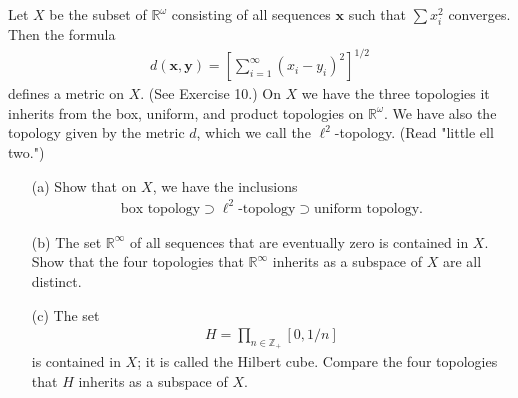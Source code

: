   \begin{exercise}[Munkres 20.8]
    Let $X$ be the subset of $\mathbb{R}^\omega$ consisting of all sequences $\mathbf{x}$ such that $\sum x_i^2$ converges. Then the formula
    \begin{align*}
      d(\mathbf{x}, \mathbf{y}) = \left[\sum_{i=1}^{\infty}(x_i - y_i)^2\right]^{1/2}
    \end{align*}
    defines a metric on $X$. (See Exercise 10.) On $X$ we have the three topologies it inherits from the box, uniform, and product topologies on $\mathbb{R}^\omega$. We have also the topology given by the metric $d$, which we call the $\ell^2$-topology. (Read "little ell two.")
    \begin{enumerate} 
      \item[(a)] Show that on $X$, we have the inclusions
      \begin{align*}
        \text{box topology} \supset \ell^2\text{-topology} \supset \text{uniform topology}.
      \end{align*}
      
      \item[(b)] The set $\mathbb{R}^\infty$ of all sequences that are eventually zero is contained in $X$. Show that the four topologies that $\mathbb{R}^\infty$ inherits as a subspace of $X$ are all distinct.
      
      \item[(c)] The set
      \begin{align*}
        H = \prod_{n\in\mathbb{Z}_+} [0, 1/n]
      \end{align*}
      is contained in $X$; it is called the Hilbert cube. Compare the four topologies that $H$ inherits as a subspace of $X$.
    \end{enumerate}
  \end{exercise}

